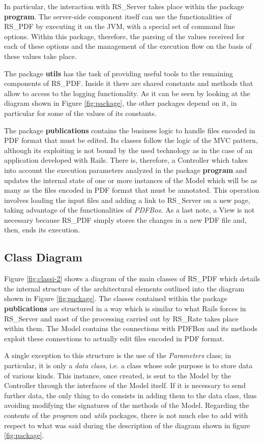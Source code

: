 \documentclass[a4paper, english]{article}
\begin{document}
In particular, the interaction with RS\_Server takes place within the package \textbf{program}. The server-side component itself can use the functionalities of RS\_PDF by executing it on the JVM, with a special set of command line options. Within this package, therefore, the parsing of the values received for each of these options and the management of the execution flow on the basis of these values take place.

The package \textbf{utils} has the task of providing useful tools to the remaining components of RS\_PDF. Inside it there are shared constants and methods that allow to access to the logging functionality. As it can be seen by looking at the diagram shown in Figure \ref{fig:package}, the other packages depend on it, in particular for some of the values of its constants.

The package \textbf{publications} contains the business logic to handle files encoded in PDF format that must be edited. Its classes follow the logic of the MVC pattern, although its exploiting is not bound by the used technology as in the case of an application developed with Rails. There is, therefore, a Controller which takes into account the execution parameters analyzed in the package \textbf{program} and updates the internal state of one or more instances of the Model which will be as many as the files encoded in PDF format that must be annotated. This operation involves loading the input files and adding a link to RS\_Server on a new page, taking advantage of the functionalities of \emph{PDFBox}. As a last note, a View is not necessary because RS\_PDF simply stores the changes in a new PDF file and, then, ends its execution.

\subsection{Class Diagram}

Figure \ref{fig:classi-2} shows a diagram of the main classes of RS\_PDF which details the internal structure of the architectural elements outlined into the diagram shown in Figure \ref{fig:package}. The classes contained within the package \textbf{publications} are structured in a way which is similar to what Rails forces in RS\_Server and most of the processing carried out by RS\_Rate takes place within them. The Model contains the connections with PDFBox and its methods exploit these connections to actually edit files encoded in PDF format. 

A single exception to this structure is the use of the \emph{Parameters} class; in particular, it is only a \emph{data class}, i.e. a class whose sole purpose is to store data of various kinds. This instance, once created, is sent to the Model by the Controller through the interfaces of the Model itself. If it is necessary to send further data, the only thing to do consists in adding them to the data class, thus avoiding modifying the signatures of the methods of the Model. Regarding the contents of the \emph{program} and \emph{utils} packages, there is not much else to add with respect to what was said during the description of the diagram shown in figure \ref{fig:package}.
\end{document}
